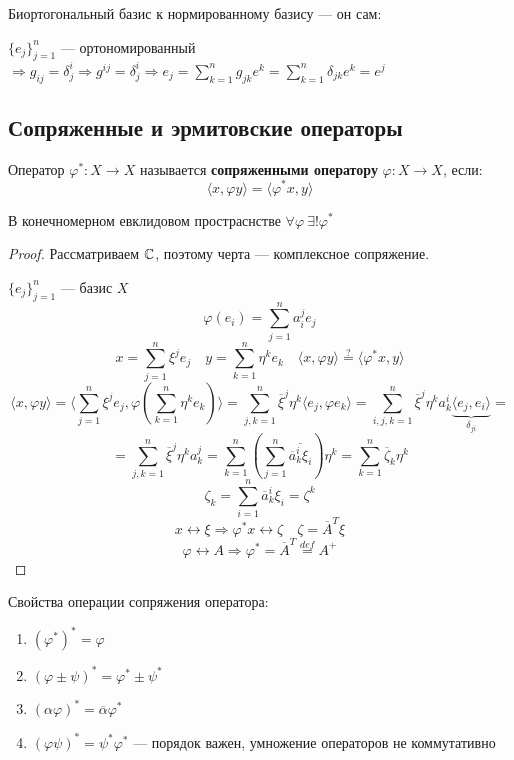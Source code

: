 \begin{remark}
    Биортогональный базис к нормированному базису --- он сам:

    $\{e_j\}_{j=1}^n$ --- ортономированный $\Rightarrow g_{ij}=\delta^i_j \Rightarrow g^{ij} = \delta^i_j \Rightarrow e_j=\sum_{k=1}^n g_{jk}e^k = \sum_{k=1}^n \delta_{jk} e^k = e^j$
\end{remark}

\subsection{Сопряженные и эрмитовские операторы}

\begin{definition}
    Оператор $\varphi^* : X \to X$ называется \textbf{сопряженными оператору} $\varphi : X \to X$, если: $$\langle x, \varphi y \rangle = \langle \varphi^* x , y \rangle$$
\end{definition}

\begin{theorem}
    В конечномерном евклидовом простраснстве $\forall \varphi \ \exists! \varphi^*$
\end{theorem}
\begin{proof}
    Рассматриваем $\mathbb{C}$, поэтому черта --- комплексное сопряжение.

    $\{e_j\}_{j=1}^n$ --- базис $X$
    $$\varphi(e_i) = \sum_{j=1}^n a_i^j e_j$$
    $$x = \sum_{j=1}^n \xi^j e_j \quad y = \sum_{k=1}^n \eta^k e_k \quad \langle x , \varphi y\rangle \stackrel{?}{=} \langle \varphi^* x, y \rangle$$
    $$\langle x, \varphi y \rangle = \langle \sum_{j=1}^n \xi^j e_j, \varphi\left(\sum_{k=1}^n \eta^k e_k\right)\rangle = \sum_{j,k=1}^n \overline \xi^j \eta^k \langle e_j, \varphi e_k\rangle = \sum_{i,j,k=1}^n \overline \xi^j \eta^k a_k^i \underbrace{\langle e_j, e_i\rangle}_{\delta_{ji}}=$$
    $$=\sum_{j,k=1}^n \overline\xi^j \eta^k a_k^j = \sum_{k=1}^n \left(\sum_{j=1}^n \overline{\overline a_k^i \xi_i }\right)\eta^k=\sum_{k=1}^n \overline \zeta_k\eta^k$$
    $$\zeta_k = \sum_{i=1}^n \overline a_k^i \xi_i = \zeta^k$$
    $$x\leftrightarrow \xi \Rightarrow \varphi^* x \leftrightarrow \zeta \quad \zeta = \overline A^T \xi$$
    $$\varphi \leftrightarrow A \Rightarrow \varphi^* = \overline A^T \stackrel{def}{=} A^+$$
\end{proof}

Свойства операции сопряжения оператора:
\begin{enumerate}
    \item $(\varphi^*)^* = \varphi$
    \item $(\varphi\pm\psi)^*=\varphi^*\pm\psi^*$
    \item $(\alpha \varphi)^* = \overline \alpha \varphi^*$
    \item $(\varphi\psi)^* = \psi^*\varphi^*$ --- порядок важен, умножение операторов не коммутативно
\end{enumerate}

